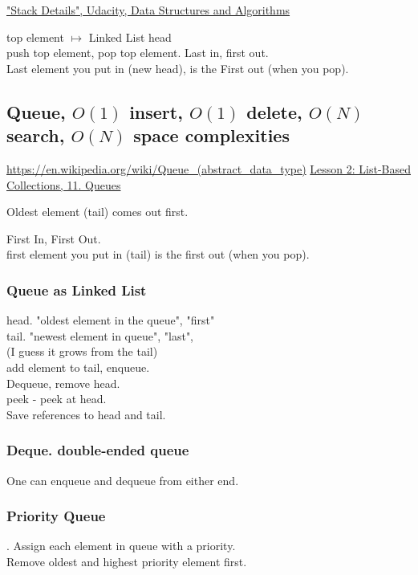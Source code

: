 \documentclass[10pt]{amsart}
\begin{document}
\href{https://classroom.udacity.com/courses/ud513/lessons/7117335401/concepts/71225347790923}{"Stack Details", Udacity, Data Structures and Algorithms}

top element $\mapsto $ Linked List head \\
push top element, pop top element.
Last in, first out. \\
Last element you put in (new head), is the First out (when you pop).

\subsection{Queue, $O(1)$ insert, $O(1)$ delete, $O(N)$ search, $O(N)$ space complexities}

\url{https://en.wikipedia.org/wiki/Queue_(abstract_data_type)}
\href{https://classroom.udacity.com/courses/ud513/lessons/7117335401/concepts/71222050580923}{Lesson 2: List-Based Collections, 11. Queues}

Oldest element (tail) comes out first.

First In, First Out. \\
first element you put in (tail) is the first out (when you pop). \\

\subsubsection{Queue as Linked List}

head. "oldest element in the queue", "first" \\
tail. "newest element in queue", "last", \\
(I guess it grows from the tail) \\
add element to tail, enqueue. \\
Dequeue, remove head. \\
peek - peek at head. \\

Save references to head and tail.

\subsubsection{Deque. double-ended queue}

One can enqueue and dequeue from either end.

\subsubsection{Priority Queue}. 
Assign each element in queue with a priority. \\
Remove oldest and highest priority element first.
\end{document}
